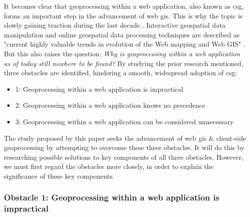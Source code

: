 It becomes clear that \ac{geoprocessing} within a web application, also known as \ac{csg}, forms an important step in the advancement of web \ac{gis}. This is why the topic is slowly gaining traction during the last decade \cite{kulawiak_analysis_2019, panidi_hybrid_2015, hamilton_client-side_2014}. Interactive geospatial data manipulation and online geospatial data processing techniques are described as "current highly valuable trends in evolution of the Web mapping and Web GIS" \cite{panidi_hybrid_2015}. But this also raises the question: \textit{Why is geoprocessing within a web application as of today still nowhere to be found?} By studying the prior research mentioned, three obstacles are identified, hindering a smooth, widespread adoption of \ac{csg}: 
\begin{itemize}
  \item 1: Geoprocessing within a web application is impractical
  \item 2: Geoprocessing within a web application knows no precedence
  \item 3: Geoprocessing within a web application can be considered unnecessary 
\end{itemize}

The study proposed by this paper seeks the advancement of web \ac{gis} \& client-side geoprocessing by attempting to overcome these three obstacles. It will do this by researching possible solutions to key components of all three obstacles. However, we must first regard the obstacles more closely, in order to explain the significance of these key components. 

\newpage
\subsubsection*{Obstacle 1: Geoprocessing within a web application is impractical}

